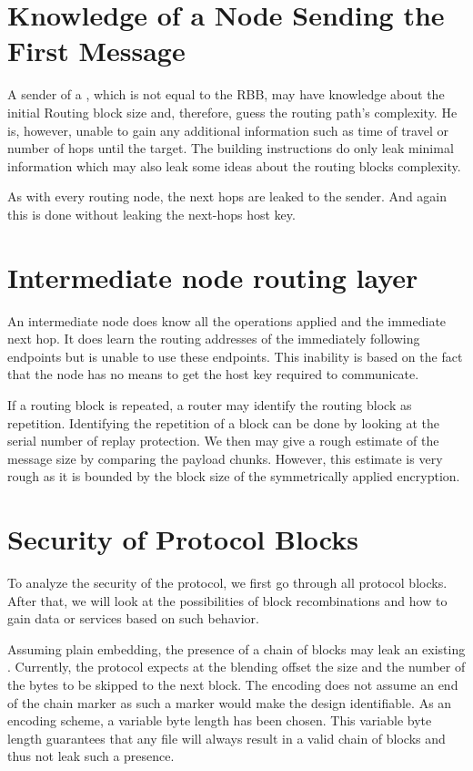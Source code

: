 \section{Knowledge of a Node Sending the First Message}
A sender of a \VortexMessage{}, which is not equal to the RBB, may have knowledge about the initial Routing block size and, therefore, guess the routing path's complexity. He is, however, unable to gain any additional information such as time of travel or number of hops until the target. The building instructions do only leak minimal information which may also leak some ideas about the routing blocks complexity. 

As with every routing node, the next hops are leaked to the sender. And again this is done without leaking the next-hops host key.

\section{Intermediate node routing layer}
An intermediate node does know all the operations applied and the immediate next hop. It does learn the routing addresses of the immediately following endpoints but is unable to use these endpoints. This inability is based on the fact that the node has no means to get the host key required to communicate.

If a routing block is repeated, a router may identify the routing block as repetition. Identifying the repetition of a block can be done by looking at the serial number of replay protection. We then may give a rough estimate of the message size by comparing the payload chunks. However, this estimate is very rough as it is bounded by the block size of the symmetrically applied encryption.

\section{Security of Protocol Blocks}
To analyze the security of the protocol, we first go through all protocol blocks. After that, we will look at the possibilities of block recombinations and how to gain data or services based on such behavior. 

Assuming plain embedding, the presence of a chain of blocks may leak an existing \VortexMessage. Currently, the protocol expects at the blending offset the size and the number of the bytes to be skipped to the next block. The encoding does not assume an end of the chain marker as such a marker would make the design identifiable. As an encoding scheme, a variable byte length has been chosen. This variable byte length guarantees that any file will always result in a valid chain of blocks and thus not leak such a presence.

